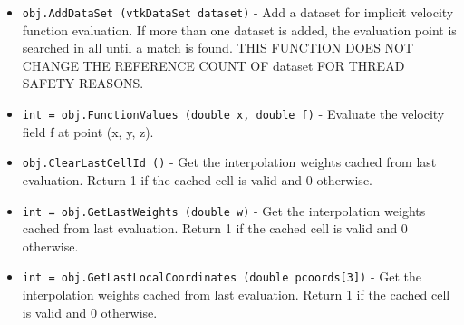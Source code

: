 \begin{itemize}
\item  \verb|obj.AddDataSet (vtkDataSet dataset)| -  Add a dataset for implicit velocity function evaluation. If more than 
 one dataset is added, the evaluation point is searched in all until a
 match is found. THIS FUNCTION DOES NOT CHANGE THE REFERENCE COUNT OF 
 dataset FOR THREAD SAFETY REASONS.

\item  \verb|int = obj.FunctionValues (double x, double f)| -  Evaluate the velocity field f at point (x, y, z).

\item  \verb|obj.ClearLastCellId ()| -  Get the interpolation weights cached from last evaluation. Return 1 if the
 cached cell is valid and 0 otherwise.

\item  \verb|int = obj.GetLastWeights (double w)| -  Get the interpolation weights cached from last evaluation. Return 1 if the
 cached cell is valid and 0 otherwise.

\item  \verb|int = obj.GetLastLocalCoordinates (double pcoords[3])| -  Get the interpolation weights cached from last evaluation. Return 1 if the
 cached cell is valid and 0 otherwise.

\end{itemize}
